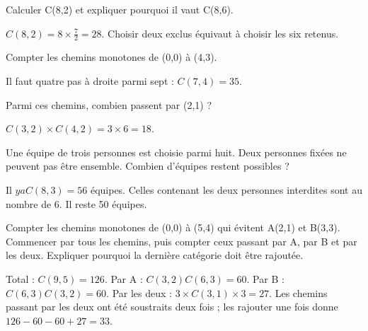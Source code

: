 \documentclass[11pt]{article}
\begin{document}
Calculer C(8,2) et expliquer pourquoi il vaut C(8,6).\par
\(C(8,2) = 8 \times  \frac{7}{2} = 28\). Choisir deux exclus équivaut à choisir les six retenus.\par
{}
Compter les chemins monotones de (0,0) à (4,3).\par
Il faut quatre pas à droite parmi sept : \(C(7,4) = 35\).\par
{}
Parmi ces chemins, combien passent par (2,1) ?\par
\(C(3,2) \times  C(4,2) = 3 \times  6 = 18\).\par
{}
Une équipe de trois personnes est choisie parmi huit. Deux personnes fixées ne peuvent pas être ensemble. Combien d’équipes restent possibles ?\par
Il \(y a C(8,3) = 56\) équipes. Celles contenant les deux personnes interdites sont au nombre de 6. Il reste 50 équipes.\par
{}
Compter les chemins monotones de (0,0) à (5,4) qui évitent A(2,1) et B(3,3). Commencer par tous les chemins, puis compter ceux passant par A, par B et par les deux. Expliquer pourquoi la dernière catégorie doit être rajoutée.\par
Total : \(C(9,5) = 126\). Par A : \(C(3,2)C(6,3) = 60\). Par B : \(C(6,3)C(3,2) = 60\). Par les deux : \(3 \times  C(3,1) \times  3 = 27\). Les chemins passant par les deux ont été soustraits deux fois ; les rajouter une fois donne \(126 - 60 - 60 + 27 = 33\).\par
\end{document}
